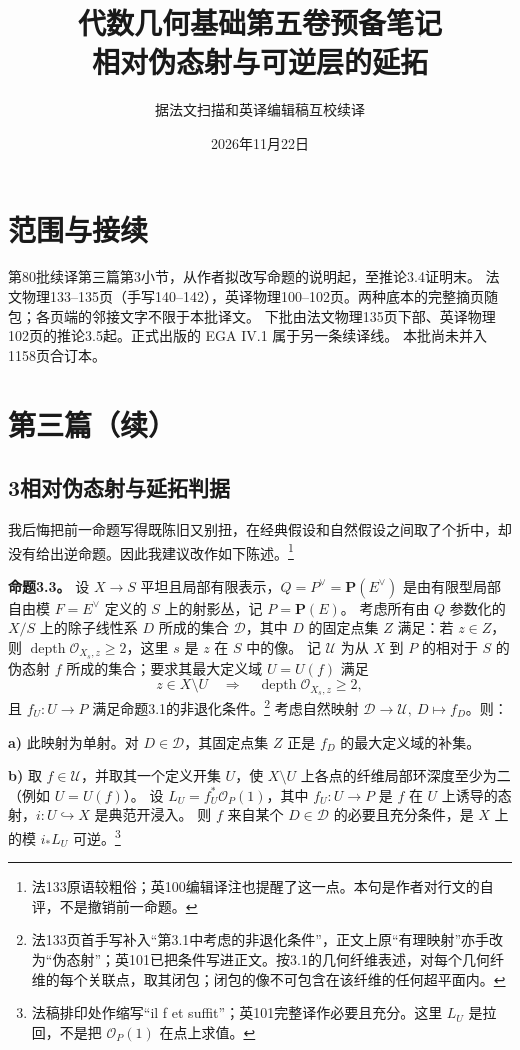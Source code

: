 \documentclass[openany,fontset=fandol]{ctexbook}
\DeclareMathOperator{\depth}{depth}
\newcommand{\OO}{\mathcal O}
\begin{document}
\title{代数几何基础第五卷预备笔记\\相对伪态射与可逆层的延拓}
\author{据法文扫描和英译编辑稿互校续译}
\date{2026年11月22日}
\maketitle
\chapter*{范围与接续}
第80批续译第三篇第3小节，从作者拟改写命题的说明起，至推论3.4证明末。
法文物理133--135页（手写140--142），英译物理100--102页。两种底本的完整摘页随包；各页端的邻接文字不限于本批译文。
下批由法文物理135页下部、英译物理102页的推论3.5起。正式出版的 EGA IV.1 属于另一条续译线。
本批尚未并入1158页合订本。
\chapter*{第三篇（续）}
\section*{3\quad 相对伪态射与延拓判据}
我后悔把前一命题写得既陈旧又别扭，在经典假设和自然假设之间取了个折中，却没有给出逆命题。因此我建议改作如下陈述。\footnote{法133原语较粗俗；英100编辑译注也提醒了这一点。本句是作者对行文的自评，不是撤销前一命题。}

\medskip\noindent\textbf{命题3.3。}
设 \(X\to S\) 平坦且局部有限表示，\(Q=P^\vee=\mathbf P(E^\vee)\) 是由有限型局部自由模
\(F=E^\vee\) 定义的 \(S\) 上的射影丛，记 \(P=\mathbf P(E)\)。
考虑所有由 \(Q\) 参数化的 \(X/S\) 上的除子线性系 \(D\) 所成的集合 \(\mathcal D\)，其中 \(D\) 的固定点集 \(Z\) 满足：若 \(z\in Z\)，则 \(\depth\OO_{X_s,z}\ge2\)，这里 \(s\) 是 \(z\) 在 \(S\) 中的像。
记 \(\mathcal U\) 为从 \(X\) 到 \(P\) 的相对于 \(S\) 的伪态射 \(f\) 所成的集合；要求其最大定义域 \(U=U(f)\) 满足
\[
 z\in X\setminus U\quad\Longrightarrow\quad \depth\OO_{X_s,z}\ge2,
\]
且 \(f_U:U\to P\) 满足命题3.1的非退化条件。\footnote{法133页首手写补入“第3.1中考虑的非退化条件”，正文上原“有理映射”亦手改为“伪态射”；英101已把条件写进正文。按3.1的几何纤维表述，对每个几何纤维的每个关联点，取其闭包；闭包的像不可包含在该纤维的任何超平面内。}
考虑自然映射 \(\mathcal D\to\mathcal U,\ D\mapsto f_D\)。则：

\noindent\textbf{a)} 此映射为单射。对 \(D\in\mathcal D\)，其固定点集 \(Z\) 正是 \(f_D\) 的最大定义域的补集。

\noindent\textbf{b)} 取 \(f\in\mathcal U\)，并取其一个定义开集 \(U\)，使 \(X\setminus U\) 上各点的纤维局部环深度至少为二（例如 \(U=U(f)\)）。
设 \(L_U=f_U^*\OO_P(1)\)，其中 \(f_U:U\to P\) 是 \(f\) 在 \(U\) 上诱导的态射，\(i:U\hookrightarrow X\) 是典范开浸入。
则 \(f\) 来自某个 \(D\in\mathcal D\) 的必要且充分条件，是 \(X\) 上的模 \(i_*L_U\) 可逆。\footnote{法稿排印处作缩写“il f et suffit”；英101完整译作必要且充分。这里 \(L_U\) 是拉回，不是把 \(\OO_P(1)\) 在点上求值。}
\end{document}
